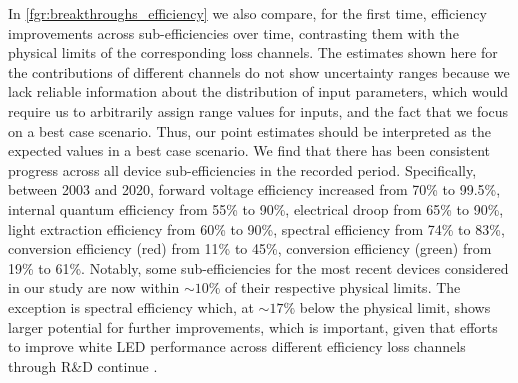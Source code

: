 \documentclass[parskip=full]{article}
\begin{document}
In \cref{fgr:breakthroughs_efficiency} we also compare, for the first time, efficiency improvements across sub-efficiencies over time, contrasting them with the physical limits of the corresponding loss channels. The estimates shown here for the contributions of different channels do not show uncertainty ranges because we lack reliable information about the distribution of input parameters, which would require us to arbitrarily assign range values for inputs, and the fact that we focus on a best case scenario. Thus, our point estimates should be interpreted as the expected values in a best case scenario. We find that there has been consistent progress across all device sub-efficiencies in the recorded period. Specifically, between 2003 and 2020, forward voltage efficiency increased from 70\% to 99.5\%, internal quantum efficiency from 55\% to 90\%, electrical droop from 65\% to 90\%, light extraction efficiency from 60\% to 90\%, spectral efficiency from 74\% to 83\%, conversion efficiency (red) from 11\% to 45\%, conversion efficiency (green) from 19\% to 61\%. Notably, some sub-efficiencies for the most recent devices considered in our study are now within $\sim10\%$ of their respective physical limits. The exception is spectral efficiency which, at $\sim17\%$ below the physical limit, shows larger potential for further improvements, which is important, given that efforts to improve white LED performance across different efficiency loss channels through R\&D continue \cite{cho2017white, Weisbuch2020}. 
\end{document}
